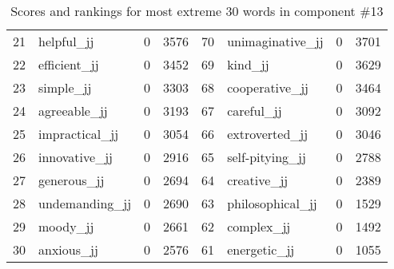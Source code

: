 \begin{table}[tbp]
\begin{tabular}{| rlr@{.}l | rlr@{.}l |}
    21 & helpful\_jj & 0 & 3576    &    70 & unimaginative\_jj & 0 & 3701 \\
    22 & efficient\_jj & 0 & 3452    &    69 & kind\_jj & 0 & 3629 \\
    23 & simple\_jj & 0 & 3303    &    68 & cooperative\_jj & 0 & 3464 \\
    24 & agreeable\_jj & 0 & 3193    &    67 & careful\_jj & 0 & 3092 \\
    25 & impractical\_jj & 0 & 3054    &    66 & extroverted\_jj & 0 & 3046 \\
    26 & innovative\_jj & 0 & 2916    &    65 & self-pitying\_jj & 0 & 2788 \\
    27 & generous\_jj & 0 & 2694    &    64 & creative\_jj & 0 & 2389 \\
    28 & undemanding\_jj & 0 & 2690    &    63 & philosophical\_jj & 0 & 1529 \\
    29 & moody\_jj & 0 & 2661    &    62 & complex\_jj & 0 & 1492 \\
    30 & anxious\_jj & 0 & 2576    &    61 & energetic\_jj & 0 & 1055 \\
    \hline
    \end{tabular}
    \caption{Scores and rankings for most extreme 30 words in component \#13} 
\end{table}
\clearpage
